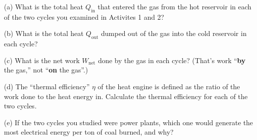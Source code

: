 (a)  What is the total heat $Q_\text{in}$ that entered the gas from the hot reservoir in each of the two cycles you examined in Activites 1 and 2?


(b) What is the total heat $Q_\text{out}$ dumped out of the gas into the cold reservoir in each cycle?


(c)  What is the net work $W_\text{net}$ done by the gas in each cycle?  (That's work ``\textbf{by} the gas,'' not ``\textbf{on} the gas''.) 


(d)  The ``thermal efficiency'' $\eta$ of the heat engine is defined as the ratio of the work done to the heat energy in.  Calculate the thermal efficiency for each of the two cycles.

\GasCycleComparison{$\eta =$}

(e) If the two cycles you studied were power plants, which one would generate the most electrical energy per ton of coal burned, and why?





